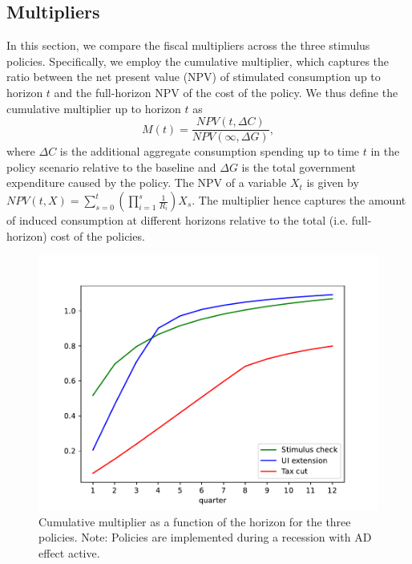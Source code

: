 \documentclass[\econtexRoot/HAFiscal]{subfiles}
\begin{document}
\hypertarget{multipliers}{}\par\subsection{Multipliers}
\notinsubfile{\label{sec:multipliers}}

In this section, we compare the fiscal multipliers across the three stimulus policies. Specifically, we employ the cumulative multiplier, which captures the ratio between the net present value (NPV) of stimulated consumption up to horizon $t$ and the full-horizon NPV of the cost of the policy. We thus define the cumulative multiplier up to horizon $t$ as
\begin{equation}
	\label{eqn:cumMultiplier}
  M(t) = \frac{NPV(t,\Delta C)}{NPV (\infty,\Delta G)},
\end{equation}
where $\Delta C$ is the additional aggregate consumption spending up to time $t$ in the policy scenario relative to the baseline and $\Delta G$ is the total government expenditure caused by the policy. The NPV of a variable $X_t$ is given by 
$NPV(t,X) = \sum_{s=0}^{t} \left( \prod_{i=1}^{s} \frac{1}{R_i} \right) X_s$. 
The multiplier hence captures the amount of induced consumption at different horizons relative to the total (i.e. full-horizon) cost of the policies. 

\begin{figure}[t]
  \centering
  \includegraphics[width=0.8\linewidth]{Code/HA-Models/FromPandemicCode/Figures/Cummulative_multipliers}
  \caption{Cumulative multiplier as a function of the horizon for the three policies. Note: Policies are implemented during a recession with AD effect active.}
  \notinsubfile{\label{fig:cumulativemultipliers}}
\end{figure}
\end{document}
